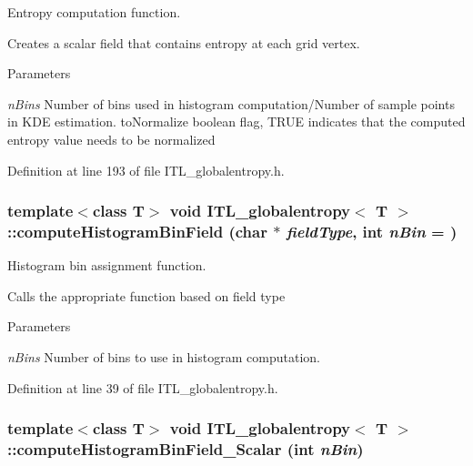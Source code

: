 Entropy computation function. 

Creates a scalar field that contains entropy at each grid vertex. 
\begin{DoxyParams}{Parameters}
\item[{\em nBins}]Number of bins used in histogram computation/Number of sample points in KDE estimation.  toNormalize boolean flag, TRUE indicates that the computed entropy value needs to be normalized \end{DoxyParams}


Definition at line 193 of file ITL\_\-globalentropy.h.

\hypertarget{classITL__globalentropy_afe13cb031dbfa959c547ac1a0d849472}{
\subsubsection[{computeHistogramBinField}]{\setlength{\rightskip}{0pt plus 5cm}template$<$class T$>$ void {\bf ITL\_\-globalentropy}$<$ T $>$::computeHistogramBinField (char $\ast$ {\em fieldType}, \/  int {\em nBin} = {})}}
\label{classITL__globalentropy_afe13cb031dbfa959c547ac1a0d849472}


Histogram bin assignment function. 

Calls the appropriate function based on field type 
\begin{DoxyParams}{Parameters}
\item[{\em nBins}]Number of bins to use in histogram computation. \end{DoxyParams}


Definition at line 39 of file ITL\_\-globalentropy.h.

\hypertarget{classITL__globalentropy_aad50922e014e3b5929e9415c8ddef382}{
\subsubsection[{computeHistogramBinField\_\-Scalar}]{\setlength{\rightskip}{0pt plus 5cm}template$<$class T$>$ void {\bf ITL\_\-globalentropy}$<$ T $>$::computeHistogramBinField\_\-Scalar (int {\em nBin})}}
\label{classITL__globalentropy_aad50922e014e3b5929e9415c8ddef382}



